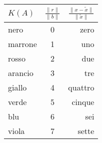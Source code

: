 \begin{center}
\begin{tabular}{ | l | c | r | }
	\hline
	$K(A)$    & $\frac{\|r\|}{\|b\|}$ & $\frac{\|x-\tilde{x}\|}{\|\tilde{x}\|}$ \\
	\hline
	nero    & 0           & zero                                          \\
	marrone & 1           & uno                                           \\
	rosso   & 2           & due                                           \\
	arancio & 3           & tre                                           \\
	giallo  & 4           & quattro                                       \\
	verde   & 5           & cinque                                        \\
	blu     & 6           & sei                                           \\
	viola   & 7           & sette                                         \\
	\hline
\end{tabular}
\end{center}